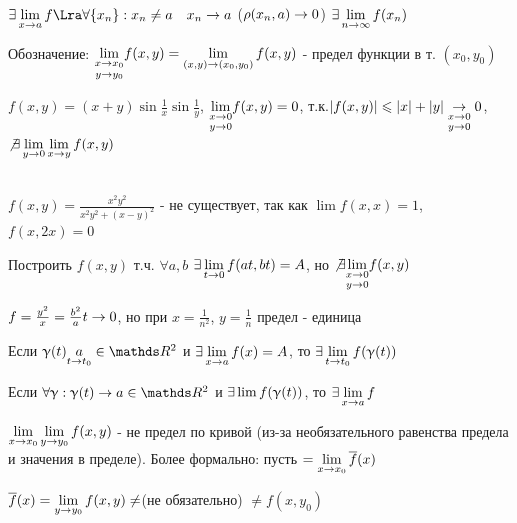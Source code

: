 \documentclass[12pt, fleqn]{article}
\begin{document}
\begin{upr}
    $\e \lim\limits_{x \ra a} f \Lra \forall \{x_n\}: x_n \neq a \q x_n \ra a$ ($\rho(x_n,a) \rightarrow 0$) $\exists \lim\limits_{n \rightarrow \infty} f(x_n)$
\end{upr}

Обозначение: $\underset{y \rightarrow y_0}{\lim\limits_{x \rightarrow x_0}} f(x,y) = \lim\limits_{(x,y) \rightarrow (x_0,y_0)} f(x,y)$ - предел функции в т. $(x_0,y_0)$

\begin{example}
    $f(x,y)=(x+y)\sin \frac{1}{x} \sin \frac{1}{y}$, $\underset{y \rightarrow 0}{\lim\limits_{x \rightarrow 0}} f(x,y) = 0$, т.к.$|f(x,y)| \leqslant |x|+|y| \underset{y \rightarrow 0}{\underset{x \rightarrow 0}{\rightarrow}} 0$, $\not \exists \lim\limits_{y \rightarrow 0} \lim\limits_{x \rightarrow y} f(x,y)$
\end{example}

\begin{example}\\
    $f(x,y)=\frac{x^2 y^2}{x^2 y^2 + (x-y)^2}$ - не существует, так как $\lim f(x,x)=1$, $f(x,2x)=0$
\end{example}

\begin{example}
    Построить $f(x,y)$ т.ч. $\forall a,b$ $\exists \lim\limits_{t \rightarrow 0} f(at,bt)=A$, но $\not \exists \underset{y \rightarrow 0}{\lim\limits_{x \rightarrow 0}} f(x,y)$

    $f=\frac{y^2}{x}=\frac{b^2}{a} t \rightarrow 0$, но при $x=\frac{1}{n^2}$, $y=\frac{1}{n}$ предел - единица
\end{example}

\begin{remark}
    Если $\upgamma(t) \us{t \ra t_0}{a} \in \R^2$ и $\exists \lim\limits_{x \rightarrow a} f(x)=A$, то $\exists \lim\limits_{t \rightarrow t_0} f(\upgamma(t))$
\end{remark}

\begin{remark}
    Если $\forall \upgamma: \upgamma(t) \ra a \in \R^2$ и $\exists \lim f(\upgamma(t))$, то $\exists \lim\limits_{x \rightarrow a} f$
\end{remark}

\begin{remark}
    $\lim\limits_{x \rightarrow x_0} \lim\limits_{y \rightarrow y_0} f(x,y)$ - не предел по кривой (из-за необязательного равенства предела и значения в пределе). Более формально: пусть $=\lim\limits_{x \rightarrow x_0} \overline{f}(x)$

    $\overline{f}(x)=\lim\limits_{y \rightarrow y_0} f(x,y) \neq$(не обязательно) $\neq f(x,y_0)$
\end{remark}
\end{document}
